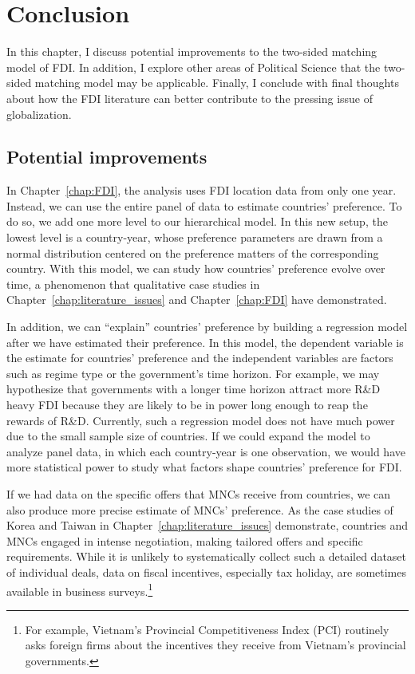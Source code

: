 \chapter{Conclusion}
\label{chap:conclusion}

In this chapter, I discuss potential improvements to the two-sided matching
model of FDI. In addition, I explore other areas of Political Science that the
two-sided matching model may be applicable. Finally, I conclude with final
thoughts about how the FDI literature can better contribute to the pressing
issue of globalization.

\section{Potential improvements}

In Chapter~\ref{chap:FDI}, the analysis uses FDI location data from only one
year. Instead, we can use the entire panel of data to estimate countries'
preference. To do so, we add one more level to our hierarchical model. In this
new setup, the lowest level is a country-year, whose preference parameters are
drawn from a normal distribution centered on the preference matters of the
corresponding country. With this model, we can study how countries' preference
evolve over time, a phenomenon that qualitative case studies in
Chapter~\ref{chap:literature_issues} and Chapter~\ref{chap:FDI} have
demonstrated.

In addition, we can ``explain'' countries' preference by building a regression
model after we have estimated their preference. In this model, the dependent
variable is the estimate for countries' preference and the independent variables
are factors such as regime type or the government's time horizon. For example,
we may hypothesize that governments with a longer time horizon attract more R\&D
heavy FDI because they are likely to be in power long enough to reap the rewards
of R\&D. Currently, such a regression model does not have much power due to the
small sample size of countries. If we could expand the model to analyze panel
data, in which each country-year is one observation, we would have more
statistical power to study what factors shape countries' preference for FDI.

If we had data on the specific offers that MNCs receive from countries, we can
also produce more precise estimate of MNCs' preference. As the case studies of
Korea and Taiwan in Chapter~\ref{chap:literature_issues} demonstrate, countries
and MNCs engaged in intense negotiation, making tailored offers and specific
requirements. While it is unlikely to systematically collect such a detailed
dataset of individual deals, data on fiscal incentives, especially tax holiday,
are sometimes available in business surveys.\footnote{For example, Vietnam's
  Provincial Competitiveness Index (PCI) routinely asks foreign firms about the
  incentives they receive from Vietnam's provincial governments.}

